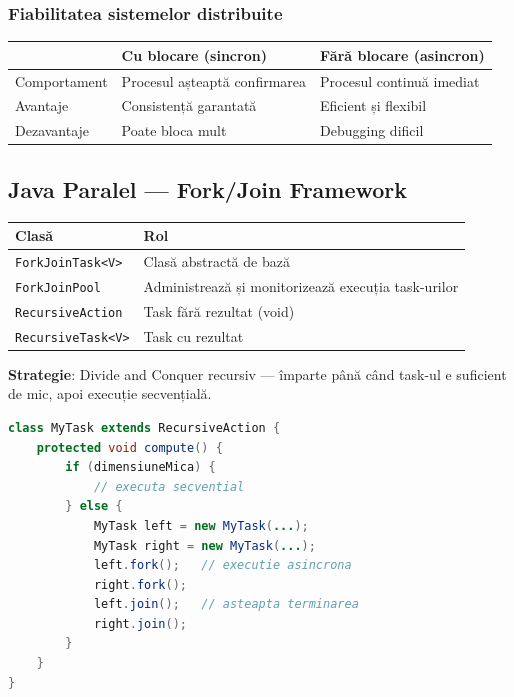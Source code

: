 \documentclass[a4paper,11pt]{article}
\newcommand{\thead}[1]{\cellcolor{tblheader}\color{white}\textbf{#1}}
\begin{document}
\subsubsection{Fiabilitatea sistemelor distribuite}
\begin{center}
\begin{tabular}{lll}
\toprule
\thead{} & \thead{Cu blocare (sincron)} & \thead{Fără blocare (asincron)} \\
\midrule
Comportament & Procesul așteaptă confirmarea & Procesul continuă imediat \\
Avantaje & Consistență garantată & Eficient și flexibil \\
Dezavantaje & Poate bloca mult & Debugging dificil \\
\bottomrule
\end{tabular}
\end{center}

\subsection{Java Paralel — Fork/Join Framework}

\begin{center}
\begin{tabularx}{\textwidth}{lX}
\toprule
\thead{Clasă} & \thead{Rol} \\
\midrule
\lstinline|ForkJoinTask<V>| & Clasă abstractă de bază \\
\lstinline|ForkJoinPool| & Administrează și monitorizează execuția task-urilor \\
\lstinline|RecursiveAction| & Task fără rezultat (void) \\
\lstinline|RecursiveTask<V>| & Task cu rezultat \\
\bottomrule
\end{tabularx}
\end{center}

\textbf{Strategie}: Divide and Conquer recursiv — împarte până când task-ul e suficient de mic, apoi execuție secvențială.

\begin{lstlisting}[language=Java]
class MyTask extends RecursiveAction {
    protected void compute() {
        if (dimensiuneMica) {
            // executa secvential
        } else {
            MyTask left = new MyTask(...);
            MyTask right = new MyTask(...);
            left.fork();   // executie asincrona
            right.fork();
            left.join();   // asteapta terminarea
            right.join();
        }
    }
}
\end{lstlisting}
\end{document}
